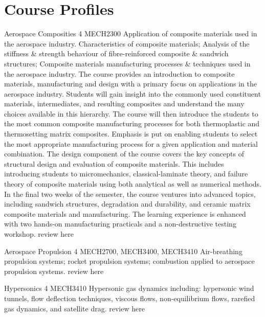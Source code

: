 \chapter{Course Profiles}


	{Aerospace Composities}
	{4}
	{MECH2300}
	{}
	{}
	{Application of composite materials used in the aerospace industry. Characteristics of composite materials; Analysis of the stiffness & strength behaviour of fibre-reinforced composite & sandwich structures; Composite materials manufacturing processes & techniques used in the aerospace industry. The course provides an introduction to composite materials, manufacturing and design with a primary focus on applications in the aerospace industry. Students will gain insight into the commonly used constituent materials, intermediates, and resulting composites and understand the many choices available in this hierarchy. The course will then introduce the students to the most common composite manufacturing processes for both thermoplastic and thermosetting matrix composites. Emphasis is put on enabling students to select the most appropriate manufacturing process for a given application and material combination. The design component of the course covers the key concepts of structural design and evaluation of composite materials. This includes introducing students to micromechanics, classical-laminate theory, and failure theory of composite materials using both analytical as well as numerical methods. In the final two weeks of the semester, the course ventures into advanced topics, including sandwich structures, degradation and durability, and ceramic matrix composite materials and manufacturing. The learning experience is enhanced with two hands-on manufacturing practicals and a non-destructive testing workshop.}
	{review here}

	{Aerospace Propulsion}
	{4}
	{MECH2700, MECH3400, MECH3410}
	{}
	{}
	{Air-breathing propulsion systems; rocket propulsion systems; combustion applied to aerospace propulsion systems.}
	{review here}

	{Hypersonics}
	{4}
	{MECH3410}
	{}
	{}
	{Hypersonic gas dynamics including:  hypersonic wind tunnels, flow deflection techniques, viscous flows, non-equilibrium flows, rarefied gas dynamics, and satellite drag.}
	{review here}

